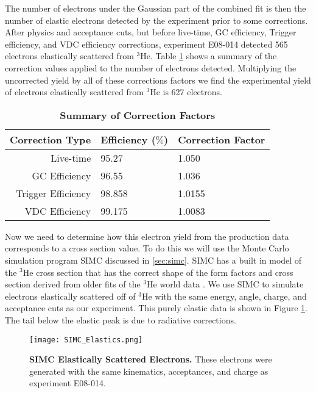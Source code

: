 The number of electrons under the Gaussian part of the combined fit is then the number of elastic electrons detected by the experiment prior to some corrections. After physics and acceptance cuts, but before live-time, GC efficiency, Trigger efficiency, and VDC efficiency corrections, experiment E08-014 detected 565 electrons elastically scattered from $^3$He. Table \ref{tab:corrections} shows a summary of the correction values applied to the number of electrons detected. Multiplying the uncorrected yield by all of these corrections factors we find the experimental yield of electrons elastically scattered from  $^3$He is 627 electrons.

\vspace{5mm}

\begin{table}[!h]
\centering
\begin{tabular}{|r | l l|}
\hline
\textbf{Correction Type} & \textbf{Efficiency ($\%$)} & \textbf{Correction Factor}\\
\hline
Live-time & 95.27 & 1.050 \\ 
GC Efficiency & 96.55 & 1.036 \\ 
Trigger Efficiency & 98.858 & 1.0155 \\ 
VDC Efficiency & 99.175 &  1.0083\\ 
\hline
\end{tabular}
\caption[Summary of Correction Factors]{{\bf{Summary of Correction Factors}} }
\label{tab:corrections}
\end{table}

Now we need to determine how this electron yield from the production data corresponds to a cross section value. To do this we will use the Monte Carlo simulation program SIMC discussed in \ref{sec:simc}. SIMC has a built in model of the $^3$He cross section that has the correct shape of the form factors and cross section derived from older fits of the $^3$He world data \cite{Article:Amroun}. We use SIMC to simulate electrons elastically scattered off of $^3$He with the same energy, angle, charge, and acceptance cuts as our experiment. This purely elastic data is shown in Figure \ref{fig:simc_elastics}. The tail below the elastic peak is due to radiative corrections.

\begin{figure}[!ht]
\begin{center}
\texttt{[image: SIMC\_Elastics.png]}
\end{center}
\caption[SIMC Elastically Scattered Electrons]{
{\bf{SIMC Elastically Scattered Electrons.}} These electrons were generated with the same kinematics, acceptances, and charge as experiment E08-014.}
\label{fig:simc_elastics}
\end{figure}

